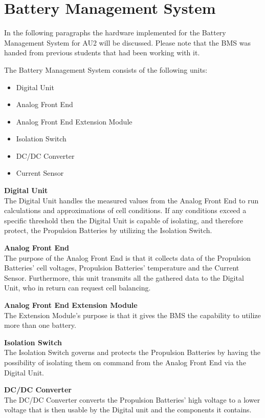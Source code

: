 \section{Battery Management System}
In the following paragraphs the hardware implemented for the Battery Management System for AU2 will be discussed. Please note that the BMS was handed from previous students that had been working with it.

The Battery Management System consists of the following units:
\begin{itemize}
	\item{Digital Unit}
	\item{Analog Front End}
	\item{Analog Front End Extension Module}
	\item{Isolation Switch}
	\item{DC/DC Converter}
	\item{Current Sensor}
\end{itemize}

\textbf{Digital Unit}\\
The Digital Unit handles the measured values from the Analog Front End to run calculations and approximations of cell conditions. If any conditions exceed a specific threshold then the Digital Unit is capable of isolating, and therefore protect, the Propulsion Batteries by utilizing the Isolation Switch.

\textbf{Analog Front End}\\
The purpose of the Analog Front End is that it collects data of the Propulsion Batteries' cell voltages, Propulsion Batteries' temperature and the Current Sensor. Furthermore, this unit transmits all the gathered data to the Digital Unit, who in return can request cell balancing. 

\textbf{Analog Front End Extension Module}\\
The Extension Module's purpose is that it gives the BMS the capability to utilize more than one battery.

\textbf{Isolation Switch}\\
The Isolation Switch governs and protects the Propulsion Batteries by having the possibility of isolating them on command from the Analog Front End via the Digital Unit. 

\textbf{DC/DC Converter}\\
The DC/DC Converter converts the Propulsion Batteries' high voltage to a lower voltage that is then usable by the Digital unit and the components it contains.

